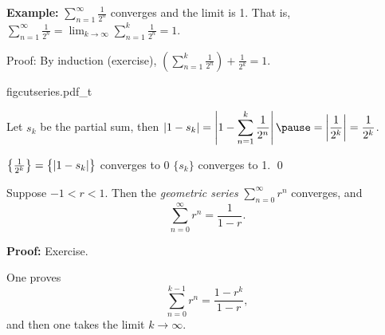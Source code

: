 \documentclass[10pt,aspectratio=149]{beamer}
\begin{document}
\begin{frame}

\textbf{Example:}
$\displaystyle \sum_{n=1}^\infty \frac{1}{2^n}$
converges and the limit is 1.  That is,
$\displaystyle
\sum_{n=1}^\infty \frac{1}{2^n} = 
\lim_{k\to\infty} \sum\limits_{n=1}^k \frac{1}{2^n} = 
1$.

\pause
\medskip

Proof: By induction (exercise), \quad
$\displaystyle
\left( \sum_{n=1}^k \frac{1}{2^n} \right)
+ \frac{1}{2^k}
= 1$.

\pause
\medskip

{figcutseries.pdf_t}

\pause
\medskip

Let $s_k$ be the partial sum, then
\quad
$\displaystyle
\abs{
1 - s_k 
}
=
\abs{
1 - 
\sum_{n=1}^k \frac{1}{2^n}
}
\pause
=
\abs{\frac{1}{2^k}} = 
\frac{1}{2^k}$.

\pause
\medskip

$\bigl\{ \frac{1}{2^k} \bigr\} = \bigl\{ \left\lvert {1-s_k} \right\rvert \bigr\}$
converges to $0$
\pause
\wthus $\{ s_k \}$ converges to 1.
\qed

\end{frame}

\begin{frame}

\begin{proposition}
Suppose
$-1 < r < 1$.  Then the \emph{geometric series}
$\displaystyle \sum_{n=0}^\infty r^n$ converges, and
\begin{equation*}
\sum_{n=0}^\infty r^n = \frac{1}{1-r} .
\end{equation*}
\end{proposition}

\pause

\textbf{Proof:} Exercise.

\pause
\medskip

One proves
\begin{equation*}
\sum_{n=0}^{k-1} r^n = \frac{1-r^k}{1-r} ,
\end{equation*}
\pause
and then one takes the limit $k \to \infty$.

\end{frame}
\end{document}

